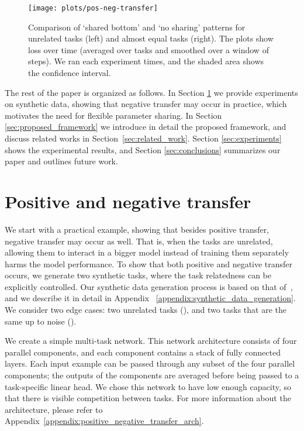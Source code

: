 \documentclass[conference]{IEEEtran}
\begin{document}
\begin{figure*}[ht]
\begin{center}
\texttt{[image: plots/pos-neg-transfer]}
\end{center}
\caption{Comparison of `shared bottom' and `no sharing' patterns for unrelated tasks (left) and almost equal tasks (right). The plots show loss over time (averaged over tasks and smoothed over a window of  steps). We ran each experiment  times, and the shaded area shows the  confidence interval.}\label{fig:pos_neg_transfer}
\end{figure*}

The rest of the paper is organized as follows.
In Section \ref{sec:positive_negative_transfer} we provide experiments on synthetic data, showing that negative transfer may occur in practice, which motivates the need for flexible parameter sharing. In Section \ref{sec:proposed_framework} we introduce in detail the proposed framework, and discuss related works in Section~\ref{sec:related_work}. Section \ref{sec:experiments} shows the experimental results, and Section \ref{sec:conclusions} summarizes our paper and outlines future work.

\section{Positive and negative transfer}\label{sec:positive_negative_transfer}

We start with a practical example, showing that besides positive transfer, negative transfer may occur as well. That is, when the tasks are unrelated, allowing them to interact in a bigger model instead of training them separately harms the model performance. 
To show that both positive and negative transfer occurs, we generate two synthetic tasks, where the task relatedness  can be explicitly controlled. Our synthetic data generation process is based on that of~\cite{MMoE-KDD-2018}, and we describe it in detail in Appendix
~\ref{appendix:synthetic_data_generation}.
We consider two edge cases: two unrelated tasks (), and two tasks that are the same up to noise ().

We create a simple multi-task network. This network architecture consists of four parallel components, and each component contains a stack of fully connected layers. Each input example can be passed through any subset of the four parallel components; the outputs of the components are averaged before being passed to a task-specific linear head. We chose this network to have low enough capacity, so that there is visible competition between tasks. For more information about the architecture, please refer to Appendix~\ref{appendix:positive_negative_transfer_arch}.
\end{document}
